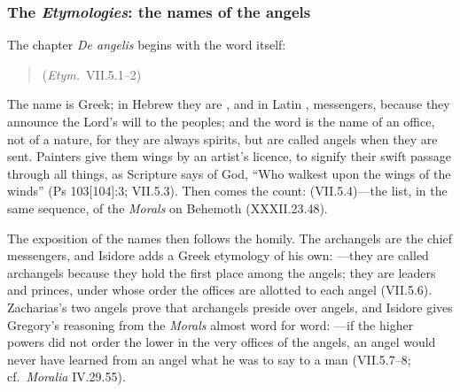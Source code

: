 \subsubsection{The \emph{Etymologies}: the names of the angels}

The chapter \emph{De angelis} begins with the word itself:

\begin{quote}
 (\emph{Etym.}\ VII.5.1--2)
\end{quote}

\noindent The name  is Greek; in Hebrew they are
, and in Latin , messengers, because they announce the
Lord's will to the peoples; and the word is the name of an office, not of a
nature, for they are always spirits, but are called angels when they are
sent. Painters give them wings by an artist's licence, to signify their
swift passage through all things, as Scripture says of God, ``Who walkest
upon the wings of the winds'' (Ps 103[104]:3; VII.5.3). Then comes the
count:  (VII.5.4)---the list, in the
same sequence, of the \emph{Morals} on Behemoth (XXXII.23.48).

The exposition of the names then follows the homily. The archangels are the
chief messengers, and Isidore adds a Greek etymology of his own:
---they are called
archangels because they hold the first place among the angels; they are
leaders and princes, under whose order the offices are allotted to each
angel (VII.5.6). Zacharias's two angels prove that archangels preside over
angels, and Isidore gives Gregory's reasoning from the \emph{Morals} almost
word for word: ---if the higher powers did not order
the lower in the very offices of the angels, an angel would never have
learned from an angel what he was to say to a man (VII.5.7--8; cf.\
\emph{Moralia} IV.29.55).

